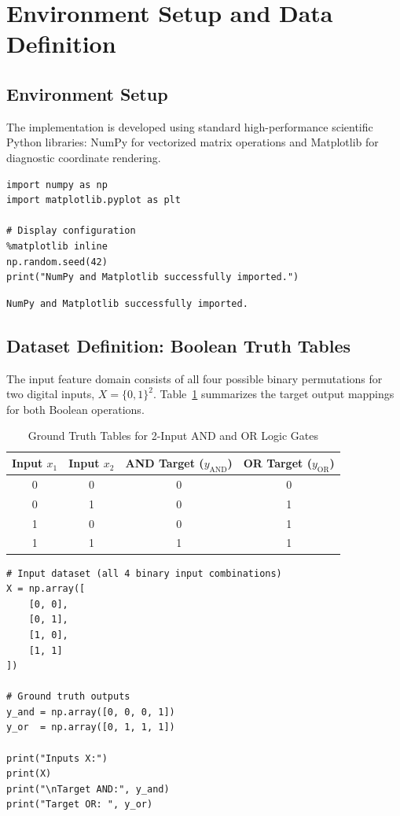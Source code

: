 \documentclass[12pt]{article}
\begin{document}
\newpage
\section{Environment Setup and Data Definition}

\subsection{Environment Setup}
The implementation is developed using standard high-performance scientific Python libraries: NumPy for vectorized matrix operations and Matplotlib for diagnostic coordinate rendering.

\begin{lstlisting}[style=code]
import numpy as np
import matplotlib.pyplot as plt

# Display configuration
%matplotlib inline
np.random.seed(42)
print("NumPy and Matplotlib successfully imported.")
\end{lstlisting}

\begin{lstlisting}[style=output]
NumPy and Matplotlib successfully imported.
\end{lstlisting}

\subsection{Dataset Definition: Boolean Truth Tables}
The input feature domain consists of all four possible binary permutations for two digital inputs, $X = \{0, 1\}^2$. Table~\ref{tab:truth_tables} summarizes the target output mappings for both Boolean operations.

\begin{table}[H]
\centering
\caption{Ground Truth Tables for 2-Input AND and OR Logic Gates}
\label{tab:truth_tables}
\vspace{0.2cm}
\begin{tabular}{cccc}
\toprule
\textbf{Input $x_1$} & \textbf{Input $x_2$} & \textbf{AND Target ($y_{\text{AND}}$)} & \textbf{OR Target ($y_{\text{OR}}$)} \\
\midrule
0 & 0 & 0 & 0 \\
0 & 1 & 0 & 1 \\
1 & 0 & 0 & 1 \\
1 & 1 & 1 & 1 \\
\bottomrule
\end{tabular}
\end{table}

\begin{lstlisting}[style=code]
# Input dataset (all 4 binary input combinations)
X = np.array([
    [0, 0],
    [0, 1],
    [1, 0],
    [1, 1]
])

# Ground truth outputs
y_and = np.array([0, 0, 0, 1])
y_or  = np.array([0, 1, 1, 1])

print("Inputs X:")
print(X)
print("\nTarget AND:", y_and)
print("Target OR: ", y_or)
\end{lstlisting}
\end{document}
